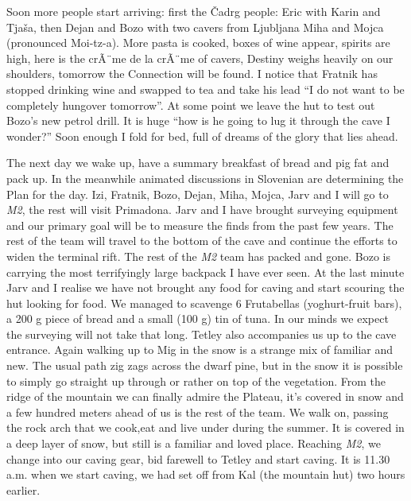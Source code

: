 Soon more people start arriving: first the \v{C}adrg people: Eric with
Karin and Tja\v{s}a, then Dejan and Bozo with two cavers from Ljubljana
Miha and Mojca (pronounced Moi-tz-a). More pasta is cooked, boxes of
wine appear, spirits are high, here is the crÃ¨me de la crÃ¨me of
cavers, Destiny weighs heavily on our shoulders, tomorrow the Connection
will be found. I notice that Fratnik has stopped drinking wine and
swapped to tea and take his lead ``I do not want to be completely
hungover tomorrow''. At some point we leave the hut to test out Bozo's
new petrol drill. It is huge ``how is he going to lug it through the
cave I wonder?'' Soon enough I fold for bed, full of dreams of the glory
that lies ahead.

The next day we wake up, have a summary breakfast of bread and pig fat
and pack up. In the meanwhile animated discussions in Slovenian are
determining the Plan for the day. Izi, Fratnik, Bozo, Dejan, Miha,
Mojca, Jarv and I will go to \emph{M2}, the rest will visit Primadona.
Jarv and I have brought surveying equipment and our primary goal will be
to measure the finds from the past few years. The rest of the team will
travel to the bottom of the cave and continue the efforts to widen the
terminal rift. The rest of the \emph{M2} team has packed and gone. Bozo
is carrying the most terrifyingly large backpack I have ever seen. At
the last minute Jarv and I realise we have not brought any food for
caving and start scouring the hut looking for food. We managed to
scavenge 6 Frutabellas (yoghurt-fruit bars), a 200 g piece of bread and
a small (100 g) tin of tuna. In our minds we expect the surveying will
not take that long. Tetley also accompanies us up to the cave entrance.
Again walking up to Mig in the snow is a strange mix of familiar and
new. The usual path zig zags across the dwarf pine, but in the snow it
is possible to simply go straight up through or rather on top of the
vegetation. From the ridge of the mountain we can finally admire the
Plateau, it's covered in snow and a few hundred meters ahead of us is
the rest of the team. We walk on, passing the rock arch that we cook,eat
and live under during the summer. It is covered in a deep layer of snow,
but still is a familiar and loved place. Reaching \emph{M2}, we change
into our caving gear, bid farewell to Tetley and start caving. It is
11.30 a.m. when we start caving, we had set off from Kal (the mountain
hut) two hours earlier.

